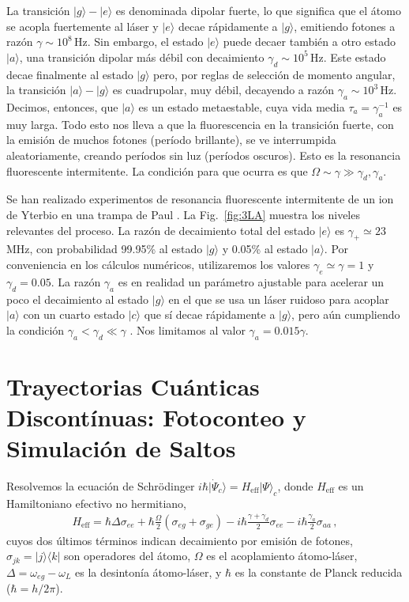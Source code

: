 \documentclass[superscriptaddress,12pt,amsmath]{revtex4-2}
\providecommand{\ket}[1]{\lvert #1 \rangle}
\begin{document}
La transici\'on $|g\rangle - |e\rangle$ es denominada dipolar fuerte, lo 
que significa que el \'atomo se acopla fuertemente al l\'aser y $|e\rangle$ 
decae r\'apidamente a $|g\rangle$, emitiendo fotones a raz\'on 
$\gamma \sim 10^8 \,\mathrm{Hz}$. Sin embargo, el estado $|e\rangle$ 
puede decaer tambi\'en a otro estado $|a\rangle$, una transici\'on dipolar 
m\'as d\'ebil con decaimiento $\gamma_d \sim 10^{5} \,\mathrm{Hz}$. 
Este estado decae finalmente al estado $|g\rangle$ pero, por reglas de 
selecci\'on de momento angular, la transici\'on $|a\rangle -|g\rangle$ es 
cuadrupolar, muy d\'ebil, decayendo a raz\'on 
$\gamma_a \sim 10^{3} \,\mathrm{Hz}$. Decimos, entonces, que 
$|a\rangle$ es un estado metaestable, cuya vida media 
$\tau_a =\gamma_a^{-1}$ es muy larga. Todo esto nos lleva a que la 
fluorescencia en la transici\'on fuerte, con la emisi\'on de muchos fotones 
(per\'iodo brillante), se ve interrumpida aleatoriamente, creando per\'iodos 
sin luz (per\'iodos oscuros). Esto es la resonancia fluorescente 
intermitente. La condici\'on para que ocurra es que 
$\Omega \sim \gamma \gg \gamma_d, \gamma_a$. 
 
Se han realizado experimentos de resonancia fluorescente  intermitente de 
un ion de Yterbio en una trampa de Paul \cite{BuTa00}. La Fig.~\ref{fig:3LA} 
muestra los niveles relevantes del proceso. La raz\'on de decaimiento total 
del estado $|e\rangle$ es $\gamma_+ \simeq 23$ MHz, con probabilidad 
99.95\% al estado $|g\rangle$ y 0.05\% al estado $|a\rangle$. Por 
conveniencia en los c\'alculos num\'ericos, utilizaremos los valores 
$\gamma_e \simeq \gamma =1$ y $\gamma_d =0.05$. La raz\'on 
$\gamma_a$ es en realidad un par\'ametro ajustable para acelerar un 
poco el decaimiento al estado  $|g\rangle$ en el que se usa un l\'aser 
ruidoso para acoplar $|a\rangle$ con un cuarto estado $|c\rangle$ que 
s\'i decae r\'apidamente a $|g\rangle$, pero a\'un cumpliendo la 
condici\'on $\gamma_a < \gamma_d \ll \gamma$ \cite{BuTa00}. Nos 
limitamos al valor $\gamma_a = 0.015 \gamma$.
 
\section{Trayectorias Cu\'anticas Discont\'inuas: Fotoconteo y 
Simulaci\'on de Saltos}
Resolvemos la ecuaci\'on de Schr\"odinger 
$i \hbar \ket{\dot{\Psi}_c} = H_{\mathrm{eff}} \ket{\Psi}_c$, donde 
$H_{\mathrm{eff}}$ es un Hamiltoniano efectivo no hermitiano,  
%
\begin{eqnarray}
H_{\mathrm{eff}} = \hbar \Delta \sigma_{ee} 
	+ \hbar \frac{\Omega}{2}(\sigma_{eg}  +\sigma_{ge}) 
 	-i \hbar \frac{\gamma+\gamma_d}{2} \sigma_{ee} 
	 -i \hbar \frac{\gamma_a}{2} \sigma_{aa} \,, 
\end{eqnarray}
cuyos dos \'ultimos t\'erminos indican decaimiento por emisi\'on de fotones, 
$\sigma_{jk} = |j\rangle \langle k|$ son operadores del \'atomo, $\Omega$ 
es el acoplamiento \'atomo-l\'aser,  $\Delta= \omega_{eg} -\omega_L$ es la 
desinton\'ia \'atomo-l\'aser, y $\hbar$ es la constante de Planck reducida 
($\hbar=h/2\pi$). 
\end{document}
